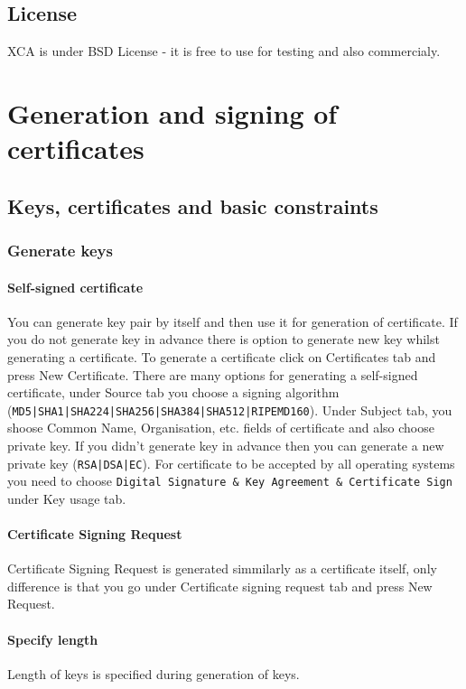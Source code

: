\documentclass[10pt, a4paper]{report}
\begin{document}
  \subsection{License}
XCA is under BSD License - it is free to use for testing and also commercialy.
  
\section{Generation and signing of certificates}

  \subsection{Keys, certificates and basic constraints}
  
    \subsubsection{Generate keys}
    
      \paragraph{Self-signed certificate}
You can generate key pair by itself and then use it for generation of certificate. If you do not generate key in advance there is option to generate new key whilst generating a certificate. To generate a certificate click on Certificates tab and press New Certificate. There are many options for generating a self-signed certificate, under Source tab you choose a signing algorithm (\verb+MD5|SHA1|SHA224|SHA256|SHA384|SHA512|RIPEMD160+). Under Subject tab, you shoose Common Name, Organisation, etc. fields of certificate and also choose private key. If you didn't generate key in advance then you can generate a new private key (\verb+RSA|DSA|EC+). For certificate to be accepted by all operating systems you need to choose \verb+Digital Signature & Key Agreement & Certificate Sign+ under Key usage tab.
      \paragraph{Certificate Signing Request}
Certificate Signing Request is generated simmilarly as a certificate itself, only difference is that you go under Certificate signing request tab and press New Request.
      \paragraph{Specify length}
Length of keys is specified during generation of keys.
\end{document}
